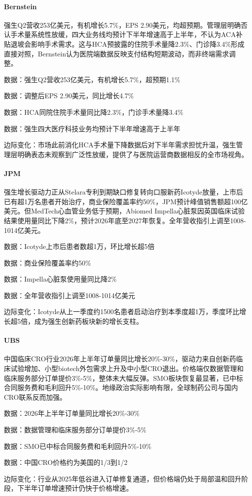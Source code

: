 \documentclass[11pt]{ctexart}
\begin{document}
\paragraph{Bernstein} 强生Q2营收253亿美元，有机增长5.7\%，EPS 2.90美元，均超预期。管理层明确否认手术量系统性放缓，四大业务线均预计下半年增速高于上半年，不认为ACA补贴退坡会影响手术需求。这与HCA预披露的住院手术量降2.3\%、门诊降3.4\%形成直接对照，Bernstein认为医院端数据反映支付结构短期波动，而非终端需求调整。
{\small\color{refgray}数据：强生Q2营收253亿美元，有机增长5.7\%，超预期1.1\%\par}
{\small\color{refgray}数据：调整后EPS 2.90美元，同比增长4.7\%\par}
{\small\color{refgray}数据：HCA同院住院手术量同比降2.3\%，门诊手术量降3.4\%\par}
{\small\color{refgray}数据：强生四大医疗科技业务均预计下半年增速高于上半年\par}
{\small\color{refgray}边际变化：市场此前消化HCA手术量下降数据后对下半年需求担忧升温，强生管理层明确表态未观察到广泛性放缓，提供了与医院运营商数据相反的全市场视角。\par}
\paragraph{JPM} 强生增长驱动力正从Stelara专利到期缺口修复转向口服新药Icotyde放量，上市后已有超1万名患者开始治疗，商业保险覆盖率约50\%，JPM预计峰值销售额超100亿美元。但MedTech心血管业务低于预期，Abiomed Impella心脏泵因英国临床试验结果使用量同比下降2\%，预计2026年底至2027年恢复。全年营收指引上调至1008-1014亿美元。
{\small\color{refgray}数据：Icotyde上市后患者数超1万，环比增长超5倍\par}
{\small\color{refgray}数据：商业保险覆盖率约50\%\par}
{\small\color{refgray}数据：Impella心脏泵使用量同比降2\%\par}
{\small\color{refgray}数据：全年营收指引上调至1008-1014亿美元\par}
{\small\color{refgray}边际变化：Icotyde从上一季度约1500名患者启动治疗到本季度超1万，季度环比增长超5倍，成为强生创新药板块新的增长支柱。\par}
\paragraph{UBS} 中国临床CRO行业2026年上半年订单量同比增长20\%-30\%，驱动力来自创新药临床试验增加、小型biotech外包需求上升及中小型CRO退出。价格端仅数据管理和临床服务部分订单提价3\%-5\%，整体未大幅反弹。SMO板块恢复最显著，已中标合同服务费和毛利回升5\%-10\%。地缘政治实际影响有限，全球制药公司与国内CRO联系反而加强。
{\small\color{refgray}数据：2026年上半年订单量同比增长20\%-30\%\par}
{\small\color{refgray}数据：数据管理和临床服务部分订单提价3\%-5\%\par}
{\small\color{refgray}数据：SMO已中标合同服务费和毛利回升5\%-10\%\par}
{\small\color{refgray}数据：中国CRO价格约为美国的1/3到1/2\par}
{\small\color{refgray}边际变化：行业从2025年低谷进入订单修复通道，但价格端仍处于局部温和回升阶段，下半年订单增速预计仍快于价格增速。\par}
\end{document}
